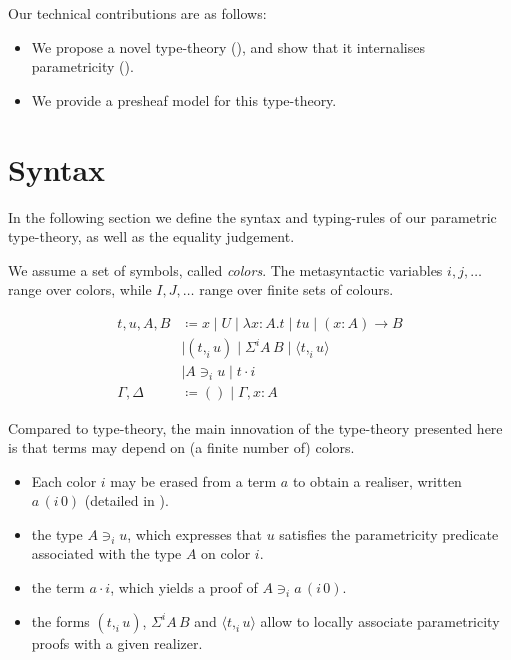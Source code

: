 \documentclass[english]{PaperTools/latex/lipics}
\newcommand\CP[3]{(#2,_{#1} #3)}
\newcommand\param[1]{\!\cdot\!#1}
\newcommand\op[1]{∋_{#1}}
\newcommand\ip[3]{Σ^{#1} {#2}\,{#3}}
\newcommand\fp[3]{⟨#2 ,_{#1} #3⟩}
\newcommand\mor[2]{({#1}\,{#2})}
\newcommand\proj[2]{{#2}\,\mor{#1}0}
\newcommand\comment[1]{}
\begin{document}
Our technical contributions are as follows:
\begin{itemize}
\item We propose a novel type-theory (), and show
  that it internalises parametricity ().
\item We provide a presheaf model for this type-theory. 
\end{itemize}

\section{Syntax}
\label{sec:syntax}
In the following section we define the syntax and typing-rules of our
parametric type-theory, as well as the equality judgement.

We assume a set of symbols, called \emph{colors}.
The metasyntactic variables $i,j,\ldots$ range over colors, while
$I,J,…$ range over finite sets of colours.

\begin{definition}
  \begin{align*}
    t,u,A,B & \coloneqq x \mid U \mid λx:A. t      \mid t u \mid (x:A) → B \\
            & \mid \CP i t u  \mid \ip i A B  \mid \fp i t u \\
            & \mid A \op i u \mid t \param i  \\
    \Gamma,\Delta & \coloneqq () \mid \Gamma,x:A
  \end{align*}
\end{definition}

Compared to type-theory, the main innovation of the type-theory
presented here is that terms may depend on (a finite number of)
colors.

\begin{itemize}
\item Each color $i$ may be erased from a term $a$ to obtain a realiser, written $\proj i a$ (detailed in ).
\item the type $A \op i u$, which expresses that $u$ satisfies the
  parametricity predicate associated with the type $A$ on color $i$.
\item the term $a \param i$, which yields a proof of $A \op i \proj i a$.
\item the forms $\CP i t u$, $\ip i A B$ and $\fp i t u$ allow to
  locally associate parametricity proofs with a given realizer.
\end{itemize}
\end{document}
